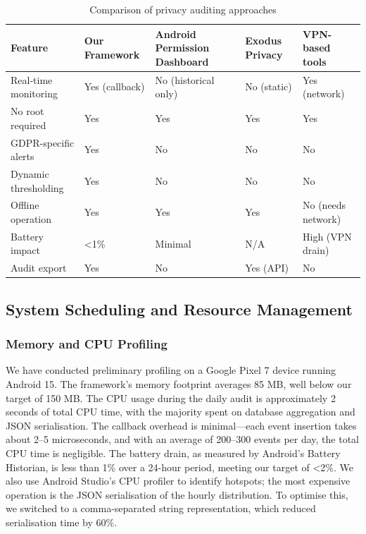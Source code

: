 \begin{table}[H]
\centering
\caption{Comparison of privacy auditing approaches}
\label{tab:comparison}
\begin{tabular}{p{3cm}|p{3cm}|p{3cm}|p{3cm}}
\toprule
\textbf{Feature} & \textbf{Our Framework} & \textbf{Android Permission Dashboard} & \textbf{Exodus Privacy} & \textbf{VPN-based tools} \\
\midrule
Real-time monitoring & Yes (callback) & No (historical only) & No (static) & Yes (network) \\
No root required & Yes & Yes & Yes & Yes \\
GDPR-specific alerts & Yes & No & No & No \\
Dynamic thresholding & Yes & No & No & No \\
Offline operation & Yes & Yes & Yes & No (needs network) \\
Battery impact & <1\% & Minimal & N/A & High (VPN drain) \\
Audit export & Yes & No & Yes (API) & No \\
\bottomrule
\end{tabular}
\end{table}

\subsection{System Scheduling and Resource Management}

\subsubsection{Memory and CPU Profiling}

We have conducted preliminary profiling on a Google Pixel 7 device running Android 15. The framework's memory footprint averages 85 MB, well below our target of 150 MB. The CPU usage during the daily audit is approximately 2 seconds of total CPU time, with the majority spent on database aggregation and JSON serialisation. The callback overhead is minimal—each event insertion takes about 2–5 microseconds, and with an average of 200–300 events per day, the total CPU time is negligible. The battery drain, as measured by Android's Battery Historian, is less than 1\% over a 24-hour period, meeting our target of <2\%. We also use Android Studio's CPU profiler to identify hotspots; the most expensive operation is the JSON serialisation of the hourly distribution. To optimise this, we switched to a comma-separated string representation, which reduced serialisation time by 60\%.


